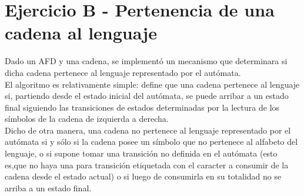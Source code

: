 \section{Ejercicio B - Pertenencia de una cadena al lenguaje}
\indent \indent Dado un AFD y una cadena, se implementó un mecanismo que determinara si dicha cadena pertenece al lenguaje representado por el autómata.\\
\indent El algoritmo es relativamente simple: define que una cadena pertenece al lenguaje si, partiendo desde el estado inicial del autómata, se puede arribar a un estado final siguiendo las transiciones de estados determinadas por la lectura de los símbolos de la cadena de izquierda a derecha.\\
\indent Dicho de otra manera, una cadena no pertenece al lenguaje representado por el autómata si y sólo si la cadena posee un símbolo que no pertenece al alfabeto del lenguaje, o si supone tomar una transición no definida en el autómata (esto es,que no haya una para transición etiquetada con el caracter a consumir de la cadena desde el estado actual) o si luego de consumirla en su totalidad no se arriba a un estado final.\\
